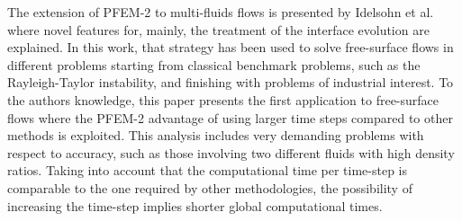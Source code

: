 
The extension of PFEM-2 to multi-fluids flows is presented by Idelsohn et al. \cite{Idelsohn13c} where novel features for, mainly, the treatment of the interface evolution are explained. In this work, that strategy has been used to solve free-surface flows in different problems starting from classical benchmark problems, such as the Rayleigh-Taylor instability, and finishing with problems of industrial interest. To the authors knowledge, this paper presents the first application to free-surface flows where the PFEM-2 advantage of using larger time steps compared to other methods is exploited. This analysis includes very demanding problems with respect to accuracy, such as those involving two different fluids with high density ratios. Taking into account that the computational time per time-step is comparable to the one required by other methodologies, the possibility of increasing the time-step implies shorter global computational times.

